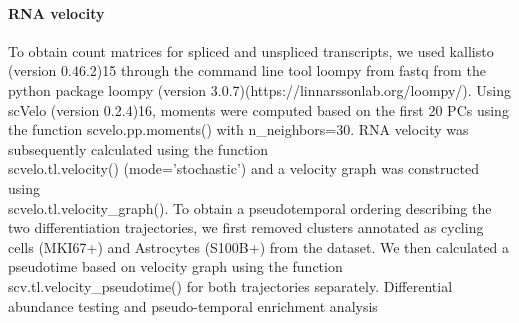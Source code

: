 \paragraph{RNA velocity}
To obtain count matrices for spliced and unspliced transcripts, we used kallisto (version 0.46.2)15 through the command line tool loompy from fastq from the python package loompy (version 3.0.7)(https://linnarssonlab.org/loompy/). Using scVelo (version 0.2.4)16, moments were computed based on the first 20 PCs using the function scvelo.pp.moments() with n\_neighbors=30. RNA velocity was subsequently calculated using the function \\ scvelo.tl.velocity() (mode=’stochastic’) and a velocity graph was constructed using \\ scvelo.tl.velocity\_graph(). To obtain a pseudotemporal ordering describing the two differentiation trajectories, we first removed clusters annotated as cycling cells (MKI67+) and Astrocytes (S100B+) from the dataset. We then calculated a pseudotime based on velocity graph using the function scv.tl.velocity\_pseudotime() for both trajectories separately.
Differential abundance testing and pseudo-temporal enrichment analysis
